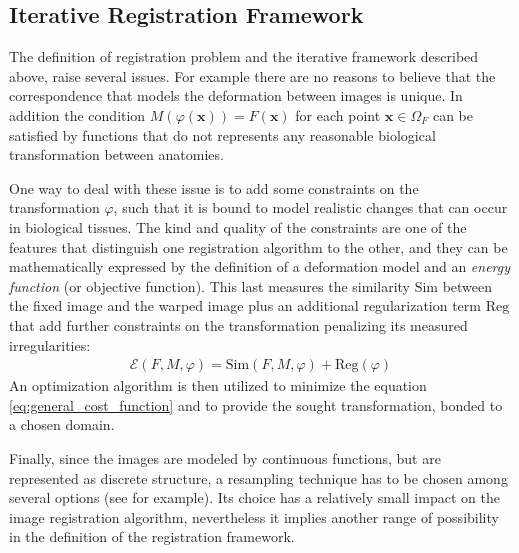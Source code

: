 \subsection{Iterative Registration Framework}

The definition of registration problem and the iterative framework described above, raise several issues. For example there are no reasons to believe that the correspondence that models the deformation between images is unique. In addition the condition $M(\varphi (\mathbf{x})) = F(\mathbf{x})$ for each point $\mathbf{x}\in \Omega_{F} $ can be satisfied by functions that do not represents any reasonable biological transformation between anatomies.

One way to deal with these issue is to add some constraints on the transformation $\varphi$, such that it is bound to model realistic changes that can occur in biological tissues. The kind and quality of the constraints are one of the features that distinguish one registration algorithm to the other, and they can be mathematically expressed by the definition of a deformation model and an \emph{energy function} (or objective function). This last measures the similarity $\text{Sim}$ between the fixed image and the warped image plus an additional regularization term $\text{Reg}$ that 
add further constraints on the transformation penalizing its measured irregularities:
\begin{align}\label{eq:general_cost_function}
\mathcal{E}(F, M, \varphi) = \text{Sim}(F,M,\varphi) + \text{Reg}(\varphi) 
\end{align}
An optimization algorithm is then utilized to minimize the equation \ref{eq:general_cost_function} and to provide the sought transformation, bonded to a chosen domain.

Finally, since the images are modeled by continuous functions, but are represented as discrete structure, a resampling technique has to be chosen among several options (see for example\cite{gonzalezdigital}). 
Its choice has a relatively small impact on the image registration algorithm, nevertheless it implies another range of possibility in the definition of the registration framework.

